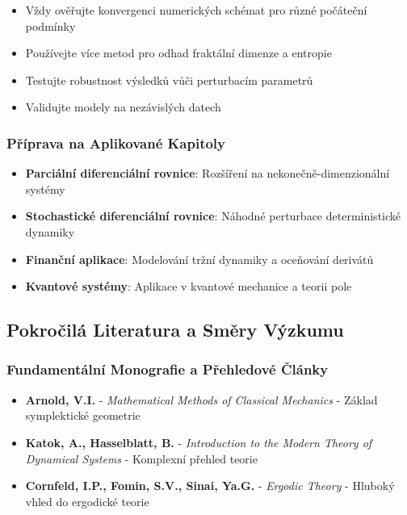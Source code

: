 \begin{expertnote}
\begin{itemize}
\item Vždy ověřujte konvergenci numerických schémat pro různé počáteční podmínky
\item Používejte více metod pro odhad fraktální dimenze a entropie
\item Testujte robustnost výsledků vůči perturbacím parametrů
\item Validujte modely na nezávislých datech
\end{itemize}
\end{expertnote}

\subsubsection{Příprava na Aplikované Kapitoly}

\begin{roadmap}
\begin{itemize}
\item \textbf{Parciální diferenciální rovnice}: Rozšíření na nekonečně-dimenzionální systémy
\item \textbf{Stochastické diferenciální rovnice}: Náhodné perturbace deterministické dynamiky
\item \textbf{Finanční aplikace}: Modelování tržní dynamiky a oceňování derivátů
\item \textbf{Kvantové systémy}: Aplikace v kvantové mechanice a teorii pole
\end{itemize}
\end{roadmap}

\spc

\subsection{Pokročilá Literatura a Směry Výzkumu}

\subsubsection{Fundamentální Monografie a Přehledové Články}

\begin{itemize}
\item \textbf{Arnold, V.I.} - \emph{Mathematical Methods of Classical Mechanics} - Základ symplektické geometrie
\item \textbf{Katok, A., Hasselblatt, B.} - \emph{Introduction to the Modern Theory of Dynamical Systems} - Komplexní přehled teorie
\item \textbf{Cornfeld, I.P., Fomin, S.V., Sinai, Ya.G.} - \emph{Ergodic Theory} - Hluboký vhled do ergodické teorie
\end{itemize}

